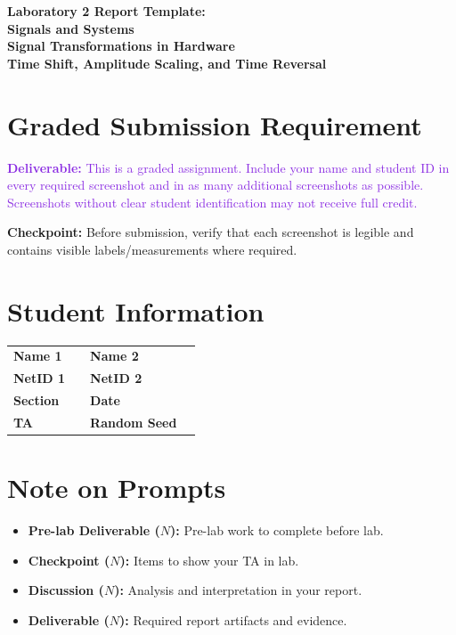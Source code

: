 \documentclass[11pt,letterpaper]{article}
\providecommand{\cpECE}[1]{\textcolor{OliveGreen}{\textbf{Checkpoint:} #1}}
\providecommand{\delECE}[1]{\textcolor{BlueViolet}{\textbf{Deliverable:} #1}}
\begin{document}
\begin{center}
\huge{\bf Laboratory 2 Report Template:}\\
\large{\bf Signals and Systems}\\
\large{\bf Signal Transformations in Hardware}\\
\large{\bf Time Shift, Amplitude Scaling, and Time Reversal}
\end{center}

\section*{Graded Submission Requirement}
\delECE{This is a graded assignment. Include your name and student ID in every required screenshot and in as many additional screenshots as possible. Screenshots without clear student identification may not receive full credit.}

\cpECE{Before submission, verify that each screenshot is legible and contains visible labels/measurements where required.}

\section*{Student Information}
\begin{tabularx}{\linewidth}{l X l X}
\toprule
\textbf{Name 1} & \underline{\hspace{5cm}} & \textbf{Name 2} & \underline{\hspace{5cm}} \\
\textbf{NetID 1} & \underline{\hspace{5cm}} & \textbf{NetID 2} & \underline{\hspace{5cm}} \\
\textbf{Section} & \underline{\hspace{5cm}} & \textbf{Date} & \underline{\hspace{5cm}} \\
\textbf{TA} & \underline{\hspace{5cm}} & \textbf{Random Seed} & \underline{\hspace{5cm}} \\
\bottomrule
\end{tabularx}

\section*{Note on Prompts}
\begin{itemize}
\item \color{BrickRed}\textbf{Pre-lab Deliverable ($N$): }Pre-lab work to complete before lab.\color{black}
\item \color{OliveGreen}\textbf{Checkpoint ($N$): }Items to show your TA in lab.\color{black}
\item \color{Plum}\textbf{Discussion ($N$): }Analysis and interpretation in your report.\color{black}
\item \color{BlueViolet}\textbf{Deliverable ($N$): }Required report artifacts and evidence.\color{black}
\end{itemize}
\end{document}
